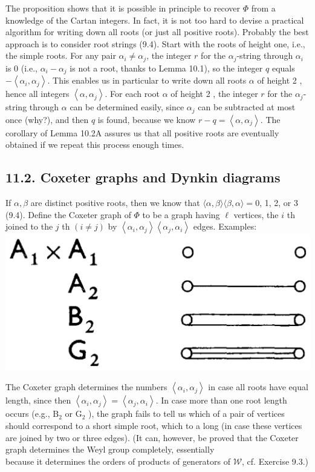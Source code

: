 \documentclass[10pt]{article}
\begin{document}
The proposition shows that it is possible in principle to recover $\Phi$ from a knowledge of the Cartan integers. In fact, it is not too hard to devise a practical algorithm for writing down all roots (or just all positive roots). Probably the best approach is to consider root strings (9.4). Start with the roots of height one, i.e., the simple roots. For any pair $\alpha_{i} \neq \alpha_{j}$, the integer $r$ for the $\alpha_{j}$-string through $\alpha_{i}$ is 0 (i.e., $\alpha_{i}-\alpha_{j}$ is not a root, thanks to Lemma 10.1), so the integer $q$ equals $-\left\langle\alpha_{i}, \alpha_{j}\right\rangle$. This enables us in particular to write down all roots $\alpha$ of height 2 , hence all integers $\left\langle\alpha, \alpha_{j}\right\rangle$. For each root $\alpha$ of height 2 , the integer $r$ for the $\alpha_{j}$-string through $\alpha$ can be determined easily, since $\alpha_{j}$ can be subtracted at most once (why?), and then $q$ is found, because we know $r-q=\left\langle\alpha, \alpha_{j}\right\rangle$. The corollary of Lemma 10.2A assures us that all positive roots are eventually obtained if we repeat this process enough times.

\subsection*{11.2. Coxeter graphs and Dynkin diagrams}
If $\alpha, \beta$ are distinct positive roots, then we know that $\langle\alpha, \beta\rangle\langle\beta, \alpha\rangle=0$, 1, 2, or 3 (9.4). Define the Coxeter graph of $\Phi$ to be a graph having $\ell$ vertices, the $i$ th joined to the $j$ th $(i \neq j)$ by $\left\langle\alpha_{i}, \alpha_{j}\right\rangle\left\langle\alpha_{j}, \alpha_{i}\right\rangle$ edges. Examples:\\
\includegraphics[max width=\textwidth, center]{2025_06_06_fac2836a92464059da43g-069(1)}

The Coxeter graph determines the numbers $\left\langle\alpha_{i}, \alpha_{j}\right\rangle$ in case all roots have equal length, since then $\left\langle\alpha_{i}, \alpha_{j}\right\rangle=\left\langle\alpha_{j}, \alpha_{i}\right\rangle$. In case more than one root length occurs (e.g., $\mathrm{B}_{2}$ or $\mathrm{G}_{2}$ ), the graph fails to tell us which of a pair of vertices should correspond to a short simple root, which to a long (in case these vertices are joined by two or three edges). (It can, however, be proved that the Coxeter graph determines the Weyl group completely, essentially\\
because it determines the orders of products of generators of $\mathscr{W}$, cf. Exercise 9.3.)
\end{document}
